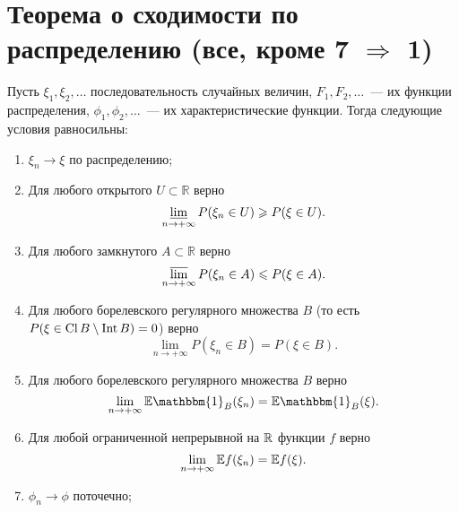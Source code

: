 \section{Теорема о сходимости по распределению (все, кроме 7 $\Rightarrow$ 1)}

\begin{theorem}
    Пусть $\xi_1, \xi_2, \ldots$ последовательность случайных величин, $F_1, F_2, \ldots$~--- их функции распределения, $\phi_1, \phi_2, \ldots$~--- их характеристические функции. Тогда следующие условия равносильны:

     \begin{enumerate}
         \item $\xi_n \rightarrow \xi$ по распределению;

         \item  Для любого открытого $ U \subset\mathbb{R}$ верно $$\varliminf_{n\rightarrow+\infty} P(\xi_n\in U ) \ge P(\xi\in U ).$$

         \item Для любого замкнутого $A\subset\mathbb{R}$ верно
         $$\varlimsup_{n\rightarrow+\infty} P(\xi_n\in A) \le P(\xi\in A).$$

         \item Для любого борелевского регулярного множества $B$ (то есть $P(\xi \in \Cl B \setminus \Int B) = 0$) верно
         $$\lim_{n\rightarrow+\infty}P(\xi_n\in B) = P(\xi \in B).$$

         \item Для любого борелевского регулярного множества $B$ верно
         $$\lim_{n\rightarrow+\infty} \EE \mathbbm{1}_B(\xi_n) = \EE \mathbbm{1}_B(\xi).$$

         \item Для любой ограниченной непрерывной на $\R$ функции $f$ верно
         $$\lim_{n\rightarrow+\infty} \EE f(\xi_n) = \EE f(\xi).$$

         \item $\phi_n\rightarrow \phi$ поточечно;
     \end{enumerate}
 \end{theorem}

